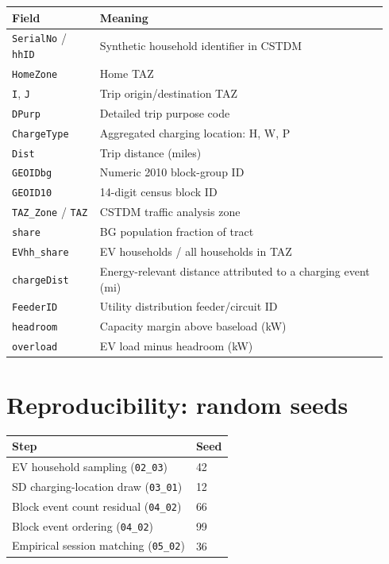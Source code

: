 \documentclass[11pt,a4paper]{article}
\begin{document}
\begin{longtable}{@{}p{0.22\linewidth}p{0.72\linewidth}@{}}
\toprule
\textbf{Field} & \textbf{Meaning} \\
\midrule
\endhead
\texttt{SerialNo} / \texttt{hhID} & Synthetic household identifier in CSTDM \\
\texttt{HomeZone} & Home TAZ \\
\texttt{I}, \texttt{J} & Trip origin/destination TAZ \\
\texttt{DPurp} & Detailed trip purpose code \\
\texttt{ChargeType} & Aggregated charging location: H, W, P \\
\texttt{Dist} & Trip distance (miles) \\
\texttt{GEOIDbg} & Numeric 2010 block-group ID \\
\texttt{GEOID10} & 14-digit census block ID \\
\texttt{TAZ\_Zone} / \texttt{TAZ} & CSTDM traffic analysis zone \\
\texttt{share} & BG population fraction of tract \\
\texttt{EVhh\_share} & EV households / all households in TAZ \\
\texttt{chargeDist} & Energy-relevant distance attributed to a charging event (mi) \\
\texttt{FeederID} & Utility distribution feeder/circuit ID \\
\texttt{headroom} & Capacity margin above baseload (kW) \\
\texttt{overload} & EV load minus headroom (kW) \\
\bottomrule
\end{longtable}

\section{Reproducibility: random seeds}

\begin{center}
\begin{tabular}{@{}ll@{}}
\toprule
\textbf{Step} & \textbf{Seed} \\
\midrule
EV household sampling (\texttt{02\_03}) & 42 \\
SD charging-location draw (\texttt{03\_01}) & 12 \\
Block event count residual (\texttt{04\_02}) & 66 \\
Block event ordering (\texttt{04\_02}) & 99 \\
Empirical session matching (\texttt{05\_02}) & 36 \\
\bottomrule
\end{tabular}
\end{center}
\end{document}
